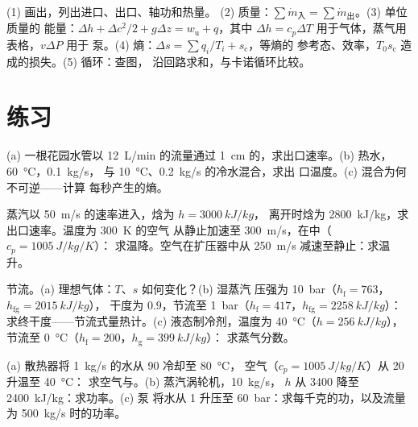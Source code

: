 \begin{method}[开口系统的平衡关系]\label{meth:b2:open-systems:method}
(1) 画出，列出进口、出口、轴功和热量。
(2) 质量：$\sum\dot m_{\text{入}} = \sum\dot m_{\text{出}}$。(3) 单位质量的
能量：$\Delta h + \Delta c^2/2 + g\Delta z = w_{\text{u}} + q$，其中
$\Delta h = c_p\Delta T$ 用于气体，蒸气用表格，$v\Delta P$ 用于
泵。(4) 熵：$\Delta s = \sum q_i/T_i + s_{\text{c}}$，等熵的
参考态、效率，$T_0s_{\text{c}}$ 造成的损失。(5) 循环：查图，
沿回路求和，与卡诺循环比较。
\end{method}

\section{练习}

\begin{exercise}[$\star$]\label{exo:b2:open-systems:1}
(a) 一根花园水管以 \qty{12}{L/min} 的流量通过 \qty{1}{cm}
的，求出口速率。(b) 热水，\qty{60}{\celsius}，\qty{0.1}{kg/s}，
与 \qty{10}{\celsius}、\qty{0.2}{kg/s} 的冷水混合，求出
口温度。(c) 混合为何不可逆——计算
每秒产生的熵。
\end{exercise}

\begin{exercise}[$\star$]\label{exo:b2:open-systems:2}
蒸汽以 \qty{50}{m/s} 的速率进入，焓为 $h = \qty{3000}{kJ/kg}$，
离开时焓为 \qty{2800}{kJ/kg}，求出口速率。温度为 \qty{300}{K} 的空气
从静止加速至 \qty{300}{m/s}，在中（$c_p = \qty{1005}{J/kg/K}$）：
求温降。空气在扩压器中从 \qty{250}{m/s} 减速至静止：求温升。
\end{exercise}

\begin{exercise}[$\star$]\label{exo:b2:open-systems:3}
节流。(a) 理想气体：$T$、$s$ 如何变化？(b) 湿蒸汽
压强为 \qty{10}{bar}（$h_{\text{f}} = 763$，$h_{\text{fg}} = \qty{2015}{kJ/kg}$），
干度为 $0.9$，节流至 \qty{1}{bar}（$h_{\text{f}} = 417$，$h_{\text{fg}}
= \qty{2258}{kJ/kg}$）：求终干度——节流式量热计。(c)
液态制冷剂，温度为 \qty{40}{\celsius}（$h = \qty{256}{kJ/kg}$），节流至
\qty{0}{\celsius}（$h_{\text{f}} = 200$，$h_{\text{g}} = \qty{399}{kJ/kg}$）：
求蒸气分数。
\end{exercise}

\begin{exercise}[$\star$]\label{exo:b2:open-systems:4}
(a) 散热器将 \qty{1}{kg/s} 的水从 \qty{90}{} 冷却至 \qty{80}{\celsius}，
空气（$c_p = \qty{1005}{J/kg/K}$）从 \qty{20}{} 升温至 \qty{40}{\celsius}：
求空气与。(b) 蒸汽涡轮机，\qty{10}{kg/s}，
$h$ 从 \qty{3400}{} 降至 \qty{2400}{kJ/kg}：求功率。(c) 泵
将水从 \qty{1}{} 升压至 \qty{60}{bar}：求每千克的功，以及流量为
\qty{500}{kg/s} 时的功率。
\end{exercise}

